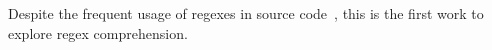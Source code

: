 Despite the frequent usage of regexes in source code~\cite{chapman2016}, this is the first work to explore regex comprehension.
%
